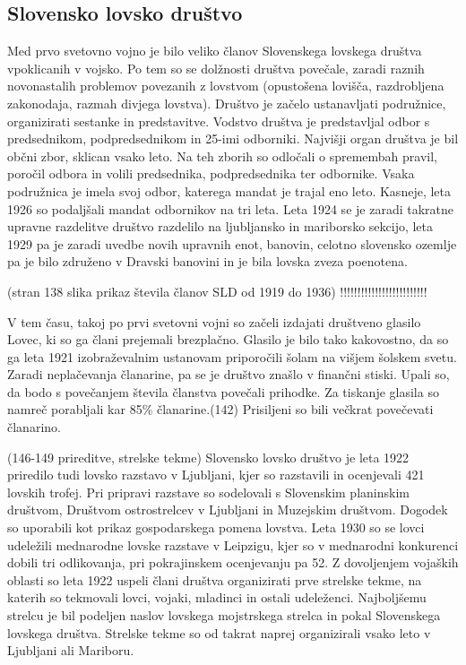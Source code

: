 \documentclass[a4paper,12pt,openright]{book}
\begin{document}
\subsection{Slovensko lovsko društvo}

Med prvo svetovno vojno je bilo veliko članov Slovenskega lovskega društva vpoklicanih v vojsko. 
Po tem so se dolžnosti društva povečale, zaradi raznih novonastalih problemov povezanih z lovstvom (opustošena lovišča, razdrobljena zakonodaja, razmah divjega lovstva). 
Društvo je začelo ustanavljati podružnice, organizirati sestanke in predstavitve. 
Vodstvo društva je predstavljal odbor s predsednikom, podpredsednikom in 25-imi odborniki. 
Najvišji organ društva je bil občni zbor, sklican vsako leto. Na teh zborih so odločali o spremembah pravil, poročil odbora in volili predsednika, podpredsednika ter odbornike. Vsaka podružnica je imela svoj odbor, katerega mandat je trajal eno leto. 
Kasneje, leta 1926 so podaljšali mandat odbornikov na tri leta. 
Leta 1924 se je zaradi takratne upravne razdelitve društvo razdelilo na ljubljansko in mariborsko sekcijo, leta 1929 pa je zaradi uvedbe novih upravnih enot, banovin, celotno slovensko ozemlje pa je bilo združeno v Dravski banovini in je bila lovska zveza poenotena. 

(stran 138 slika prikaz števila članov SLD od 1919 do 1936) !!!!!!!!!!!!!!!!!!!!!!!!! 

V tem času, takoj po prvi svetovni vojni so začeli izdajati društveno glasilo Lovec, ki so ga člani prejemali brezplačno. 
Glasilo je bilo tako kakovostno, da so ga leta 1921 izobraževalnim ustanovam priporočili šolam na višjem šolskem svetu. 
Zaradi neplačevanja članarine, pa se je društvo znašlo v finančni stiski. 
Upali so, da bodo s povečanjem števila članstva povečali prihodke. Za tiskanje glasila so namreč porabljali kar 85\% članarine.(142) 
Prisiljeni so bili večkrat povečevati članarino.

(146-149 prireditve, strelske tekme) Slovensko lovsko društvo je leta 1922 priredilo tudi lovsko razstavo v Ljubljani, kjer so razstavili in ocenjevali 421 lovskih trofej. 
Pri pripravi razstave so sodelovali s Slovenskim planinskim društvom, Društvom ostrostrelcev v Ljubljani in Muzejskim društvom. 
Dogodek so uporabili kot prikaz gospodarskega pomena lovstva. 
Leta 1930 so se lovci udeležili mednarodne lovske razstave v Leipzigu, kjer so v mednarodni konkurenci dobili tri odlikovanja, pri pokrajinskem ocenjevanju pa 52. 
Z dovoljenjem vojaških oblasti so leta 1922 uspeli člani društva organizirati prve strelske tekme, na katerih so tekmovali lovci, vojaki, mladinci in ostali udeleženci. Najboljšemu strelcu je bil podeljen naslov lovskega mojstrskega strelca in pokal Slovenskega lovskega društva. 
Strelske tekme so od takrat naprej organizirali vsako leto v Ljubljani ali Mariboru.
\end{document}
